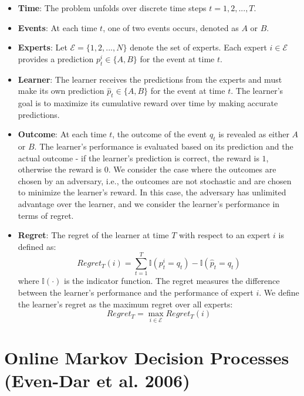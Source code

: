 \documentclass[a4paper, 12pt]{article}
\begin{document}
\begin{itemize}
    \item \textbf{Time}: The problem unfolds over discrete time steps $t = 1, 2, ..., T$.

    \item \textbf{Events}: At each time $t$, one of two events occurs, denoted as $A$ or $B$.

    \item \textbf{Experts}: Let $\mathcal{E} = \{1, 2, ..., N\}$ denote the set of experts. 
    Each expert $i \in \mathcal{E}$ provides a prediction $p_t^i \in \{A, B\}$ for the event at time $t$.
    
    \item \textbf{Learner}: The learner receives the predictions from the experts and must make its own prediction $\hat{p}_t \in \{A, B\}$ 
    for the event at time $t$.  The learner's goal is to maximize its cumulative reward over time by making accurate predictions.
    
    \item \textbf{Outcome}: At each time $t$, the outcome of the event $q_t$ is revealed as either $A$ or $B$. 
    The learner's performance is evaluated based on its prediction and the actual outcome - if the learner's prediction is correct, the reward is $1$, otherwise the reward is $0$.
    We consider the case where the outcomes are chosen by an adversary, i.e., the outcomes are not stochastic and are chosen to minimize the learner's reward.
    In this case, the adversary has unlimited advantage over the learner, and we consider the learner's performance in terms of regret.

    \item \textbf{Regret}: The regret of the learner at time $T$ with respect to an expert $i$ is defined as:
    \[
    Regret_T(i) = \sum_{t=1}^T \mathbb{I}(p_t^i = q_t) - \mathbb{I}(\hat{p}_t = q_t) 
    \]
    where $\mathbb{I}(\cdot)$ is the indicator function. The regret measures the difference between the learner's performance and the performance of expert $i$.
    We define the learner's regret as the maximum regret over all experts:
    \[
    Regret_T = \max_{i \in \mathcal{E}} Regret_T(i)
    \]

\end{itemize}


\section*{Online Markov Decision Processes (Even-Dar et al. 2006)}
\end{document}
